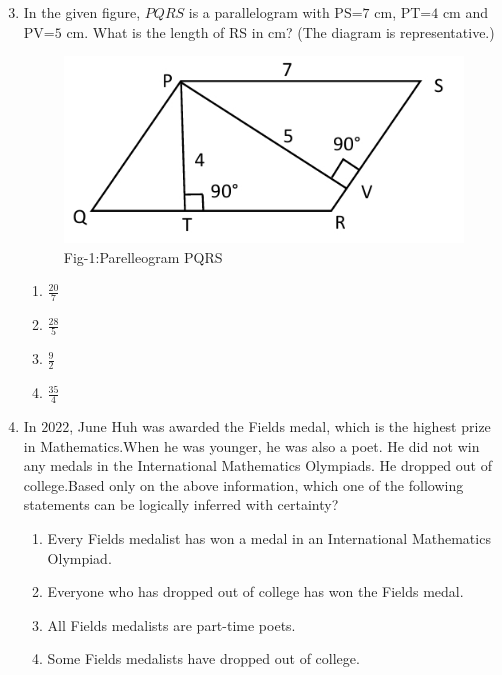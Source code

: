\documentclass[journal]{IEEEtran}
\theoremstyle{remark}
\begin{document}
\begin{enumerate}[itemsep=1em]
\setcounter{enumi}{2}
\item In the given figure, $PQRS$ is a parallelogram with PS=$7$ cm, PT=$4$ cm and PV=$5$ cm. What is the length of RS in cm? (The diagram is representative.)  
\begin{figure}[H]
    \centering
    \includegraphics[width=0.4\columnwidth]{figs/fig-1.jpeg}
    \caption*{Fig-1:Parelleogram PQRS}
    \label{fig-1}
\end{figure}
\begin{multicols}{4}
\begin{enumerate}
     \item $\frac{20}{7}$
     \item $\frac{28}{5}$
     \item $\frac{9}{2}$
     \item $\frac{35}{4}$
\end{enumerate}
\end{multicols}
\end{enumerate}
\newpage
\vspace*{0.25cm}
\begin{enumerate}[itemsep=1em]
\setcounter{enumi}{3}
\item In $2022$, June Huh was awarded the Fields medal, which is the highest prize in Mathematics.When he was younger, he was also a poet. He did not win any medals in the International Mathematics Olympiads. He dropped out of college.Based only on the above information, which one of the following statements can be logically inferred with certainty?
\begin{enumerate}[leftmargin=2.5em, labelsep=0.5em, itemsep=0.5em]
    \item Every Fields medalist has won a medal in an International Mathematics Olympiad.
    \item Everyone who has dropped out of college has won the Fields medal. 
    \item All Fields medalists are part-time poets. 
    \item Some Fields medalists have dropped out of college. 
\end{enumerate}
\end{enumerate}
\end{document}
